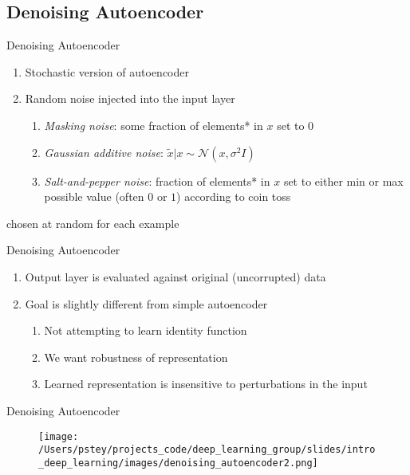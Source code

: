 \documentclass[pdf]{beamer}
\begin{document}
\subsection{Denoising Autoencoder}
			\begin{frame}{Denoising Autoencoder}
			\begin{enumerate}
				\item Stochastic version of autoencoder
				\item Random noise injected into the input layer
				\begin{enumerate}[1]
					\item \textit{Masking noise}: some fraction of elements* in $x$ set to $0$ 
					\item \textit{Gaussian additive noise}: $\tilde{x}|x \sim \mathcal{N}(x, \sigma^2I) $
					\item \textit{Salt-and-pepper noise}: fraction of elements* in $x$ set to either min or max possible value (often $0$ or $1$) according to coin toss
				\end{enumerate}
			\end{enumerate}
			\vspace{5em}
			\hspace{2em} {\tiny * chosen at random for each example}
			\end{frame}
			
	
			
			\begin{frame}{Denoising Autoencoder}
			\begin{enumerate}
				\item Output layer is evaluated against original (uncorrupted) data
				\item Goal is slightly different from simple autoencoder
				\begin{enumerate}[1]
					\item Not attempting to learn identity function
					\item We want robustness of representation
					\item Learned representation is insensitive to perturbations in the input
				\end{enumerate}
			\end{enumerate}
			\end{frame}
			
						
			
			\begin{frame}{Denoising Autoencoder}
			\begin{figure}
				\texttt{[image: /Users/pstey/projects\_code/deep\_learning\_group/slides/intro\_deep\_learning/images/denoising\_autoencoder2.png]}
			\end{figure}	
			\end{frame}
	
\end{document}
